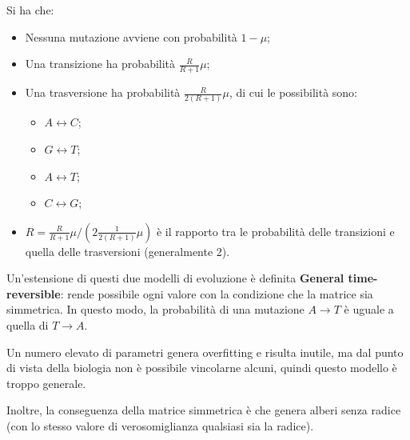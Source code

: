 Si ha che:
\begin{itemize}
	\item Nessuna mutazione avviene con probabilità $1 - \mu$;
	\item Una transizione ha probabilità $\frac{R}{R+1}\mu$;
	\item Una trasversione ha probabilità $\frac{R}{2(R+1)}\mu$, di cui le possibilità sono:
	\begin{itemize}
		\item $A \leftrightarrow C$;
		\item $G \leftrightarrow T$;
		\item $A \leftrightarrow T$;
		\item $C \leftrightarrow G$;
	\end{itemize}
	\item $R = \frac{R}{R+1}\mu/(2\frac{1}{2(R+1)}\mu)$ è il rapporto tra le probabilità delle transizioni e quella delle trasversioni (generalmente 2).
\end{itemize}

Un'estensione di questi due modelli di evoluzione è definita \textbf{General time-reversible}: rende possibile ogni valore con la condizione che la matrice sia simmetrica. In questo modo, la probabilità di una mutazione $A \rightarrow T$ è uguale a quella di $T \rightarrow A$.

Un numero elevato di parametri genera overfitting e risulta inutile, ma dal punto di vista della biologia non è possibile vincolarne alcuni, quindi questo modello è troppo generale.

Inoltre, la conseguenza della matrice simmetrica è che genera alberi senza radice (con lo stesso valore di verosomiglianza qualsiasi sia la radice).